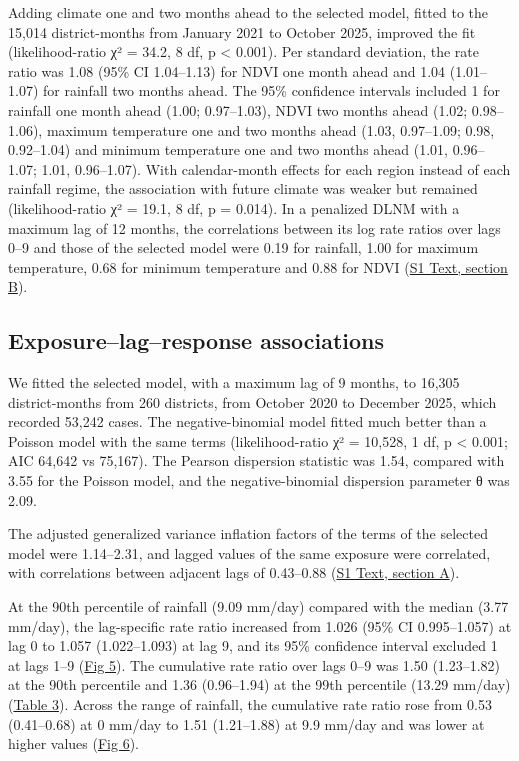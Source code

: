 \documentclass[11pt,a4paper]{article}
\begin{document}
Adding climate one and two months ahead to the selected model, fitted to the 15,014 district-months from January 2021 to October 2025, improved the fit (likelihood-ratio χ² = 34.2, 8 df, p \textless{} 0.001). Per standard deviation, the rate ratio was 1.08 (95\% CI 1.04--1.13) for NDVI one month ahead and 1.04 (1.01--1.07) for rainfall two months ahead. The 95\% confidence intervals included 1 for rainfall one month ahead (1.00; 0.97--1.03), NDVI two months ahead (1.02; 0.98--1.06), maximum temperature one and two months ahead (1.03, 0.97--1.09; 0.98, 0.92--1.04) and minimum temperature one and two months ahead (1.01, 0.96--1.07; 1.01, 0.96--1.07). With calendar-month effects for each region instead of each rainfall regime, the association with future climate was weaker but remained (likelihood-ratio χ² = 19.1, 8 df, p = 0.014). In a penalized DLNM with a maximum lag of 12 months, the correlations between its log rate ratios over lags 0--9 and those of the selected model were 0.19 for rainfall, 1.00 for maximum temperature, 0.68 for minimum temperature and 0.88 for NDVI (\hyperref[s1text-b]{S1 Text, section B}).

\subsection{Exposure--lag--response associations}

We fitted the selected model, with a maximum lag of 9 months, to 16,305 district-months from 260 districts, from October 2020 to December 2025, which recorded 53,242 cases. The negative-binomial model fitted much better than a Poisson model with the same terms (likelihood-ratio χ² = 10,528, 1 df, p \textless{} 0.001; AIC 64,642 vs 75,167). The Pearson dispersion statistic was 1.54, compared with 3.55 for the Poisson model, and the negative-binomial dispersion parameter θ was 2.09.

The adjusted generalized variance inflation factors of the terms of the selected model were 1.14--2.31, and lagged values of the same exposure were correlated, with correlations between adjacent lags of 0.43--0.88 (\hyperref[s1text-a]{S1 Text, section A}).

At the 90th percentile of rainfall (9.09 mm/day) compared with the median (3.77 mm/day), the lag-specific rate ratio increased from 1.026 (95\% CI 0.995--1.057) at lag 0 to 1.057 (1.022--1.093) at lag 9, and its 95\% confidence interval excluded 1 at lags 1--9 (\hyperref[fig5]{Fig 5}). The cumulative rate ratio over lags 0--9 was 1.50 (1.23--1.82) at the 90th percentile and 1.36 (0.96--1.94) at the 99th percentile (13.29 mm/day) (\hyperref[table3]{Table 3}). Across the range of rainfall, the cumulative rate ratio rose from 0.53 (0.41--0.68) at 0 mm/day to 1.51 (1.21--1.88) at 9.9 mm/day and was lower at higher values (\hyperref[fig6]{Fig 6}).
\end{document}
